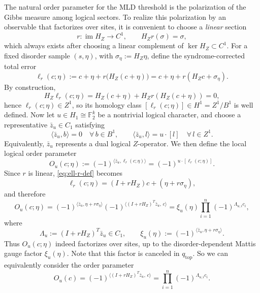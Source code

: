 \documentclass[twoside,english,aps,showpacs,pra,superscriptaddress]{revtex4-2}
\DeclareMathOperator{\im}{im}
\begin{document}
The natural order parameter for the MLD threshold is the polarization of the Gibbs measure among logical sectors. 
To realize this polarization by an observable that factorizes over sites, it is convenient to choose a \emph{linear} section
\begin{equation}\label{eq:linear-section}
    r:\im H_Z \to C^1,
    \qquad
    H_Z r(\sigma)=\sigma,
\end{equation}
which always exists after choosing a linear complement of \(\ker H_Z\subset C^1\). 
For a fixed disorder sample \((s,\eta)\), with \(\sigma_\eta:=H_Z\eta\), define the syndrome-corrected total error
\begin{equation}\label{eq:ell-r-def}
    \ell_r(c;\eta):=c+\eta+r\!\bigl(H_Z(c+\eta)\bigr)
    =c+\eta+r(H_Zc+\sigma_\eta).
\end{equation}
By construction,
\begin{equation}\label{eq:ell-r-cocycle}
    H_Z\ell_r(c;\eta)=H_Z(c+\eta)+H_Zr(H_Z(c+\eta))=0,
\end{equation}
hence \(\ell_r(c;\eta)\in Z^1\), so its homology class \([\ell_r(c;\eta)]\in H^1=Z^1/B^1\) is well defined. 
Now let \(u\in H_1\cong \mathbb F_2^k\) be a nontrivial logical character, and choose a representative \(\bar z_u\in C_1\) satisfying
\begin{equation}\label{eq:dual-logical-rep}
    \langle \bar z_u,b\rangle =0 \quad \forall\, b\in B^1,
    \qquad
    \langle \bar z_u,l\rangle =u\cdot [l] \quad \forall\, l\in Z^1 .
\end{equation}
Equivalently, \(\bar z_u\) represents a dual logical \(Z\)-operator. 
We then define the local logical order parameter
\begin{equation}\label{eq:local-order-parameter}
    O_u(c;\eta):=(-1)^{\langle \bar z_u,\ell_r(c;\eta)\rangle}
    =(-1)^{u\cdot [\ell_r(c;\eta)]}.
\end{equation}
Since \(r\) is linear, \eqref{eq:ell-r-def} becomes
\begin{equation}\label{eq:ell-r-linear}
    \ell_r(c;\eta)=(I+rH_Z)c+(\eta+r\sigma_\eta),
\end{equation}
and therefore
\begin{equation}\label{eq:local-order-factorized}
    O_u(c;\eta)
    =(-1)^{\langle \bar z_u,\eta+r\sigma_\eta\rangle}
     (-1)^{\langle (I+rH_Z)^T\bar z_u,\,c\rangle}
    =\xi_u(\eta)\prod_{i=1}^n (-1)^{\Lambda_{u,i}c_i},
\end{equation}
where
\begin{equation}\label{eq:Lambda-def}
    \Lambda_u:=(I+rH_Z)^T\bar z_u\in C_1,
    \qquad
    \xi_u(\eta):=(-1)^{\langle \bar z_u,\eta+r\sigma_\eta\rangle}.
\end{equation}
Thus \(O_u(c;\eta)\) indeed factorizes over sites, up to the disorder-dependent Mattis gauge factor \(\xi_u(\eta)\). Note that this factor is canceled in $q_{\text{top}}$. So we can equivalently consider the order parameter
\begin{equation}
    O_u(c)=(-1)^{\langle (I+rH_Z)^T\bar z_u,\,c\rangle}
    =\prod_{i=1}^n (-1)^{\Lambda_{u,i}c_i}.
\end{equation}
\end{document}

